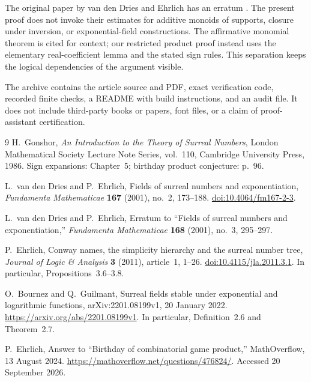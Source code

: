 \documentclass[11pt,letterpaper]{article}
\numberwithin{equation}{section}
\theoremstyle{definition}
\theoremstyle{remark}
\begin{document}
The original paper by van den Dries and Ehrlich has an erratum
\cite{vdDEErratum}. The present proof does not invoke their estimates for
additive monoids of supports, closure under inversion, or exponential-field
constructions. The affirmative monomial theorem is cited for context; our
restricted product proof instead uses the elementary real-coefficient lemma
and the stated sign rules. This separation keeps the logical dependencies of
the argument visible.

The archive contains the article source and PDF, exact verification code,
recorded finite checks, a README with build instructions, and an audit file.
It does not include third-party books or papers, font files, or a claim of
proof-assistant certification.

\clearpage
\begin{thebibliography}{9}
H.~Gonshor,
\emph{An Introduction to the Theory of Surreal Numbers},
London Mathematical Society Lecture Note Series, vol.~110,
Cambridge University Press, 1986.
Sign expansions: Chapter~5; birthday product conjecture: p.~96.

L.~van den Dries and P.~Ehrlich,
Fields of surreal numbers and exponentiation,
\emph{Fundamenta Mathematicae} \textbf{167} (2001), no.~2, 173--188.
\href{https://doi.org/10.4064/fm167-2-3}{doi:10.4064/fm167-2-3}.

L.~van den Dries and P.~Ehrlich,
Erratum to ``Fields of surreal numbers and exponentiation,''
\emph{Fundamenta Mathematicae} \textbf{168} (2001), no.~3, 295--297.

P.~Ehrlich,
Conway names, the simplicity hierarchy and the surreal number tree,
\emph{Journal of Logic \& Analysis} \textbf{3} (2011), article~1, 1--26.
\href{https://doi.org/10.4115/jla.2011.3.1}{doi:10.4115/jla.2011.3.1}.
In particular, Propositions~3.6--3.8.

O.~Bournez and Q.~Guilmant,
Surreal fields stable under exponential and logarithmic functions,
arXiv:2201.08199v1, 20 January 2022.
\url{https://arxiv.org/abs/2201.08199v1}.
In particular, Definition~2.6 and Theorem~2.7.

P.~Ehrlich,
Answer to ``Birthday of combinatorial game product,''
MathOverflow, 13 August 2024.
\url{https://mathoverflow.net/questions/476824/}.
Accessed 20 September 2026.
\end{thebibliography}
\end{document}

